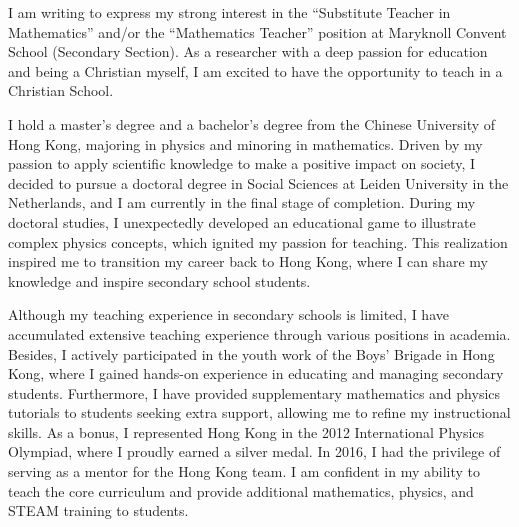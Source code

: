 \documentclass[11pt, a4paper]{awesome-cv}
\begin{document}
\makecvheader[R]

\makecvfooter
  {}%
  {}%
  {}

\makelettertitle

\begin{cvletter}

I am writing to express my strong interest in the ``Substitute Teacher in Mathematics'' and/or the ``Mathematics Teacher'' position at Maryknoll Convent School (Secondary Section). As a researcher with a deep passion for education and being a Christian myself, I am excited to have the opportunity to teach in a Christian School.

I hold a master's degree and a bachelor's degree from the Chinese University of Hong Kong, majoring in physics and minoring in mathematics. Driven by my passion to apply scientific knowledge to make a positive impact on society, I decided to pursue a doctoral degree in Social Sciences at Leiden University in the Netherlands, and I am currently in the final stage of completion. During my doctoral studies, I unexpectedly developed an educational game to illustrate complex physics concepts, which ignited my passion for teaching. This realization inspired me to transition my career back to Hong Kong, where I can share my knowledge and inspire secondary school students.

Although my teaching experience in secondary schools is limited, I have accumulated extensive teaching experience through various positions in academia. Besides, I actively participated in the youth work of the Boys' Brigade in Hong Kong, where I gained hands-on experience in educating and managing secondary students. Furthermore, I have provided supplementary mathematics and physics tutorials to students seeking extra support, allowing me to refine my instructional skills. As a bonus, I represented Hong Kong in the 2012 International Physics Olympiad, where I proudly earned a silver medal. In 2016, I had the privilege of serving as a mentor for the Hong Kong team. I am confident in my ability to teach the core curriculum and provide additional mathematics, physics, and STEAM training to students.


\end{cvletter}
\end{document}
